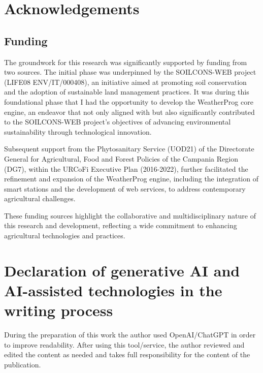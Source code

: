 \documentclass[authoryear,preprint,review,12pt]{elsarticle}
\begin{document}
\section*{Acknowledgements}
\subsection*{Funding}
The groundwork for this research was significantly supported by funding from two sources. 
The initial phase was underpinned by the SOILCONS-WEB project (LIFE08 ENV/IT/000408), an initiative aimed at promoting soil conservation and the adoption of sustainable land management practices. 
It was during this foundational phase that I had the opportunity to develop the WeatherProg core engine, an endeavor that not only aligned with but also significantly contributed to the SOILCONS-WEB project's objectives of advancing environmental sustainability through technological innovation.

Subsequent support from the Phytosanitary Service (UOD21) of the Directorate General for Agricultural, Food and Forest Policies of the Campania Region (DG7), within the URCoFi Executive Plan (2016-2022), further facilitated the refinement and expansion of the WeatherProg engine, including the integration of smart stations and the development of web services, to address contemporary agricultural challenges.

These funding sources highlight the collaborative and multidisciplinary nature of this research and development, reflecting a wide commitment to enhancing agricultural technologies and practices.%


\section{Declaration of generative AI and AI-assisted technologies in the writing process}
During the preparation of this work the author used OpenAI/ChatGPT in order to improve readability. 
After using this tool/service, the author reviewed and edited the content as needed and takes full responsibility for the content of the publication.

\end{document}

